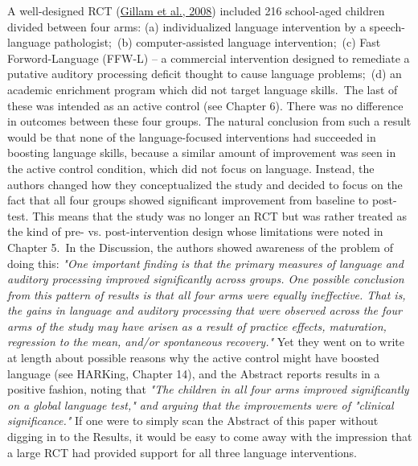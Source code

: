 \documentclass{krantz}
\begin{document}
\begin{tcolorbox}[colback=Black!5!lightgray,colframe=black!75!black,coltitle=white,title=An example of spin in evaluating speech and language therapy]\label{box:spineg}
A well-designed RCT (\protect\hyperlink{ref-gillam2008}{Gillam et al., 2008}) included 216 school-aged children divided between four arms:  
(a) individualized language intervention by a speech-language pathologist;\
(b) computer-assisted language intervention;\
(c) Fast Forword-Language (FFW-L) -- a commercial intervention designed to remediate a putative auditory processing deficit thought to cause language problems;\
(d) an academic enrichment program which did not target language skills.\
The last of these was intended as an active control (see Chapter 6). There was no difference in outcomes between these four groups. The natural conclusion from such a result would be that none of the language-focused interventions had succeeded in boosting language skills, because a similar amount of improvement was seen in the active control condition, which did not focus on language. Instead, the authors changed how they conceptualized the study and decided to focus on the fact that all four groups showed significant improvement from baseline to post-test. This means that the study was no longer an RCT but was rather treated as the kind of pre- vs. post-intervention design whose limitations were noted in Chapter 5.\
In the Discussion, the authors showed awareness of the problem of doing this: \textit{"One important finding is that the primary measures of language and auditory processing improved significantly across groups. One possible conclusion from this pattern of results is that all four arms were equally ineffective. That is, the gains in language and auditory processing that were observed across the four arms of the study may have arisen as a result of practice effects, maturation, regression to the mean, and/or spontaneous recovery."} Yet they went on to write at length about possible reasons why the active control might have boosted language (see HARKing, Chapter 14), and the Abstract reports results in a positive fashion, noting that \textit{"The children in all four arms improved significantly on a global language test," and arguing that the improvements were of "clinical significance."} If one were to simply scan the Abstract of this paper without digging in to the Results, it would be easy to come away with the impression that a large RCT had provided support for all three language interventions.
\end{tcolorbox}
\end{document}
